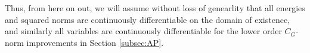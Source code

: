\documentclass[11pt,leqno,textwidth=10cm]{amsart}
\numberwithin{equation}{section}
\theoremstyle{definition}
\theoremstyle{plain}
\newcommand{\1}{\mathbbm{1}}
\renewcommand{\epsilon}{\varepsilon}
\newcommand{\RE}{\bm{E}}
\newcommand{\RB}{\bm{B}}
\newcommand{\todo}[1]{\textcolor{red}{#1}}
\newcommand{\change}[1]{\color{black}#1\color{black}}
\begin{document}
\noindent \change{Thus, }from here on out, we will assume \change{without loss of genearlity that }all energies \change{and squared norms are }continuously differentiable on the domain of existence, and similarly all variables \change{are }continuously differentiable for the lower order $C_G$-norm improvements in Section \ref{subsec:AP}.
\end{document}
